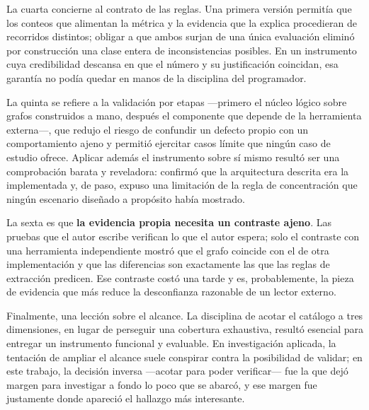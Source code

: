 La cuarta concierne al contrato de las reglas. Una primera versión permitía que los conteos que alimentan la métrica y la evidencia que la explica procedieran de recorridos distintos; obligar a que ambos surjan de una única evaluación eliminó por construcción una clase entera de inconsistencias posibles. En un instrumento cuya credibilidad descansa en que el número y su justificación coincidan, esa garantía no podía quedar en manos de la disciplina del programador.

La quinta se refiere a la validación por etapas —primero el núcleo lógico sobre grafos construidos a mano, después el componente que depende de la herramienta externa—, que redujo el riesgo de confundir un defecto propio con un comportamiento ajeno y permitió ejercitar casos límite que ningún caso de estudio ofrece. Aplicar además el instrumento sobre sí mismo resultó ser una comprobación barata y reveladora: confirmó que la arquitectura descrita era la implementada y, de paso, expuso una limitación de la regla de concentración que ningún escenario diseñado a propósito había mostrado.

La sexta es que \textbf{la evidencia propia necesita un contraste ajeno}. Las pruebas que el autor escribe verifican lo que el autor espera; solo el contraste con una herramienta independiente mostró que el grafo coincide con el de otra implementación y que las diferencias son exactamente las que las reglas de extracción predicen. Ese contraste costó una tarde y es, probablemente, la pieza de evidencia que más reduce la desconfianza razonable de un lector externo.

Finalmente, una lección sobre el alcance. La disciplina de acotar el catálogo a tres dimensiones, en lugar de perseguir una cobertura exhaustiva, resultó esencial para entregar un instrumento funcional y evaluable. En investigación aplicada, la tentación de ampliar el alcance suele conspirar contra la posibilidad de validar; en este trabajo, la decisión inversa —acotar para poder verificar— fue la que dejó margen para investigar a fondo lo poco que se abarcó, y ese margen fue justamente donde apareció el hallazgo más interesante.
